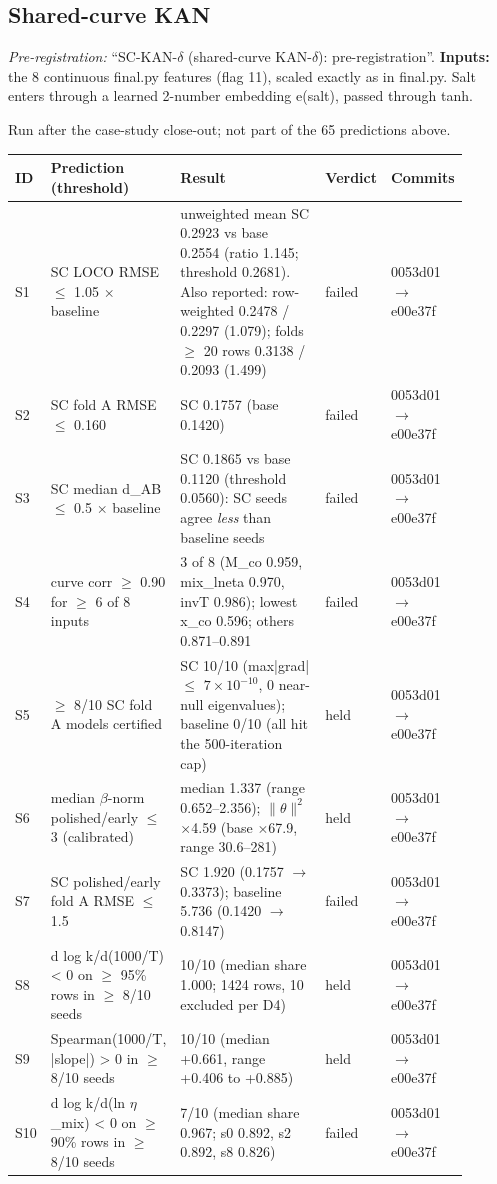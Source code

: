 \subsection{Shared-curve KAN}
\noindent\textit{Pre-registration:} ``SC-KAN-$\delta$ (shared-curve KAN-$\delta$): pre-registration''. \textbf{Inputs:} the 8 continuous final.py features (flag 11), scaled exactly as in final.py. Salt enters through a learned 2-number embedding e(salt), passed through tanh.

Run after the case-study close-out; not part of the 65 predictions above.

{\footnotesize\setlength{\tabcolsep}{3pt}
\begin{longtable}{R{0.07\linewidth} R{0.28\linewidth} R{0.35\linewidth} R{0.09\linewidth} R{0.11\linewidth}}
\toprule
ID & Prediction (threshold) & Result & Verdict & Commits \\
\midrule
\endhead
S1 & SC LOCO RMSE $\leq$ 1.05 $\times$ baseline & unweighted mean SC 0.2923 vs base 0.2554 (ratio 1.145; threshold 0.2681). Also reported: row-weighted 0.2478 / 0.2297 (1.079); folds $\geq$ 20 rows 0.3138 / 0.2093 (1.499) & failed & 0053d01$\to$\allowbreak e00e37f \\
S2 & SC fold A RMSE $\leq$ 0.160 & SC 0.1757 (base 0.1420) & failed & 0053d01$\to$\allowbreak e00e37f \\
S3 & SC median d\_AB $\leq$ 0.5 $\times$ baseline & SC 0.1865 vs base 0.1120 (threshold 0.0560): SC seeds agree \emph{less} than baseline seeds & failed & 0053d01$\to$\allowbreak e00e37f \\
S4 & curve corr $\geq$ 0.90 for $\geq$ 6 of 8 inputs & 3 of 8 (M\_co 0.959, mix\_lneta 0.970, invT 0.986); lowest x\_co 0.596; others 0.871--0.891 & failed & 0053d01$\to$\allowbreak e00e37f \\
S5 & $\geq$ 8/10 SC fold A models certified & SC 10/10 (max|grad| $\leq$ $7\times10^{-10}$, 0 near-null eigenvalues); baseline 0/10 (all hit the 500-iteration cap) & held & 0053d01$\to$\allowbreak e00e37f \\
S6 & median $\beta$-norm polished/early $\leq$ 3 (calibrated) & median 1.337 (range 0.652--2.356); $\|\theta\|^{2}$ $\times$4.59 (base $\times$67.9, range 30.6--281) & held & 0053d01$\to$\allowbreak e00e37f \\
S7 & SC polished/early fold A RMSE $\leq$ 1.5 & SC 1.920 (0.1757 $\to$\allowbreak{} 0.3373); baseline 5.736 (0.1420 $\to$\allowbreak{} 0.8147) & failed & 0053d01$\to$\allowbreak e00e37f \\
S8 & d log k/d(1000/T) < 0 on $\geq$ 95\% rows in $\geq$ 8/10 seeds & 10/10 (median share 1.000; 1424 rows, 10 excluded per D4) & held & 0053d01$\to$\allowbreak e00e37f \\
S9 & Spearman(1000/T, |slope|) > 0 in $\geq$ 8/10 seeds & 10/10 (median +0.661, range +0.406 to +0.885) & held & 0053d01$\to$\allowbreak e00e37f \\
S10 & d log k/d(ln $\eta$\_mix) < 0 on $\geq$ 90\% rows in $\geq$ 8/10 seeds & 7/10 (median share 0.967; s0 0.892, s2 0.892, s8 0.826) & failed & 0053d01$\to$\allowbreak e00e37f \\
\bottomrule
\end{longtable}}

